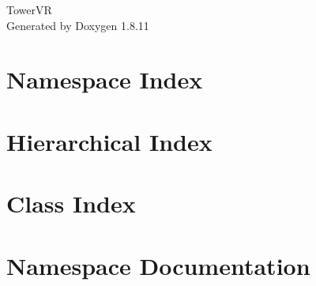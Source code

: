 \documentclass[twoside]{book}
\newcommand{\+}{\discretionary{\mbox{\scriptsize$\hookleftarrow$}}{}{}}
\newcommand{\clearemptydoublepage}{%
  \newpage{\pagestyle{empty}\cleardoublepage}%
}
\begin{document}
\hypersetup{pageanchor=false,
             bookmarksnumbered=true,
             pdfencoding=unicode
            }
\begin{titlepage}
\vspace*{7cm}
\begin{center}%
{\Large Tower\+VR }\\
\vspace*{1cm}
{\large Generated by Doxygen 1.8.11}\\
\end{center}
\end{titlepage}
\clearemptydoublepage
\tableofcontents
\clearemptydoublepage
{}
\hypersetup{pageanchor=true}

\chapter{Namespace Index}

\chapter{Hierarchical Index}

\chapter{Class Index}

\chapter{Namespace Documentation}


\end{document}
